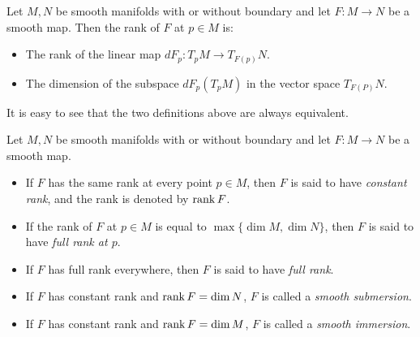 \begin{defn}[Rank]
  Let $M, N$ be smooth manifolds with or without boundary and let $F: M \rightarrow N$ be a smooth map.
  Then the rank of $F$ at $p \in M$ is:
  \begin{itemize}
    \item
      The rank of the linear map $dF_p: T_pM \rightarrow T_{F(p)}N$.
    \item
      The dimension of the subspace $dF_p(T_pM)$ in the vector space $T_{F(P)}N$.
  \end{itemize}
  It is easy to see that the two definitions above are always equivalent.
\end{defn}

\begin{defn}
  Let $M, N$ be smooth manifolds with or without boundary and let $F: M \rightarrow N$ be a smooth map.
  \begin{itemize}
    \item
      If $F$ has the same rank at every point $p \in M$, then $F$ is said to have \textit{constant rank}, and the rank is denoted by $\rank F$.
    \item
      If the rank of $F$ at $p \in M$ is equal to $\max \{ \dim M, \dim N \}$, then $F$ is said to have \textit{full rank at $p$}.
    \item
      If $F$ has full rank everywhere, then $F$ is said to have \textit{full rank}.
    \item
      If $F$ has constant rank and $\rank F = \dim N$, $F$ is called a \textit{smooth submersion}.
    \item
      If $F$ has constant rank and $\rank F = \dim M$, $F$ is called a \textit{smooth immersion}.
  \end{itemize}
\end{defn}

